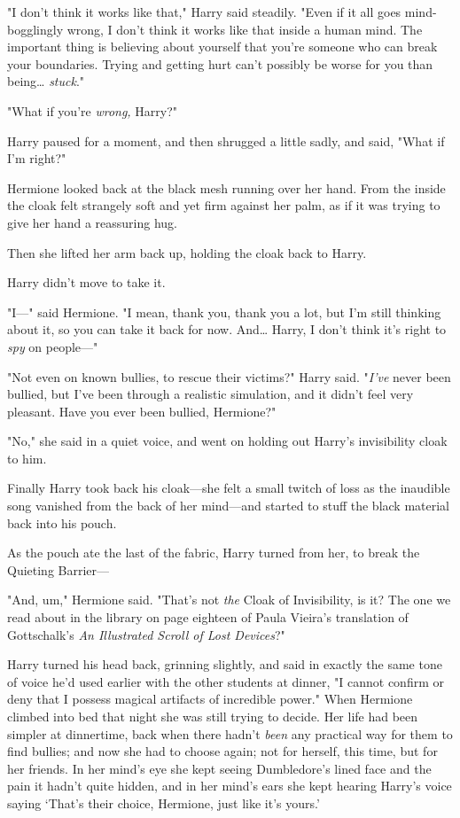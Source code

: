 "I don't think it works like that," Harry said steadily. "Even if it all goes
mind-bogglingly wrong, I don't think it works like that inside a human mind.
The important thing is believing about yourself that you're someone who can
break your boundaries. Trying and getting hurt can't possibly be worse for you
than being{\ldots} \emph{stuck}."

"What if you're \emph{wrong,} Harry?"

Harry paused for a moment, and then shrugged a little sadly, and said, "What if
I'm right?"

Hermione looked back at the black mesh running over her hand. From the inside
the cloak felt strangely soft and yet firm against her palm, as if it was
trying to give her hand a reassuring hug.

Then she lifted her arm back up, holding the cloak back to Harry.

Harry didn't move to take it.

"I---" said Hermione. "I mean, thank you, thank you a lot, but I'm still
thinking about it, so you can take it back for now. And{\ldots} Harry, I don't
think it's right to \emph{spy} on people---"

"Not even on known bullies, to rescue their victims?" Harry said. "\emph{I've}
never been bullied, but I've been through a realistic simulation, and it didn't
feel very pleasant. Have you ever been bullied, Hermione?"

"No," she said in a quiet voice, and went on holding out Harry's invisibility
cloak to him.

Finally Harry took back his cloak---she felt a small twitch of loss as the
inaudible song vanished from the back of her mind---and started to stuff the
black material back into his pouch.

As the pouch ate the last of the fabric, Harry turned from her, to break the
Quieting Barrier---

"And, um," Hermione said. "That's not \emph{the} Cloak of Invisibility, is it?
The one we read about in the library on page eighteen of Paula Vieira's
translation of Gottschalk's \emph{An Illustrated Scroll of Lost Devices}?"

Harry turned his head back, grinning slightly, and said in exactly the same
tone of voice he'd used earlier with the other students at dinner, "I cannot
confirm or deny that I possess magical artifacts of incredible power."
\later
When Hermione climbed into bed that night she was still trying to decide. Her
life had been simpler at dinnertime, back when there hadn't \emph{been} any
practical way for them to find bullies; and now she had to choose again; not
for herself, this time, but for her friends. In her mind's eye she kept seeing
Dumbledore's lined face and the pain it hadn't quite hidden, and in her mind's
ears she kept hearing Harry's voice saying `That's their choice, Hermione, just
like it's yours.'

